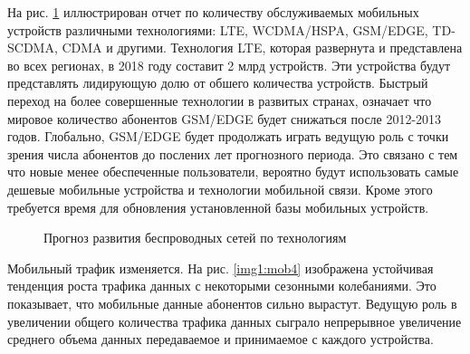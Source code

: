 На рис. \ref{img1:mob3} иллюстрирован отчет по количеству обслуживаемых мобильных устройств различными технологиями: LTE, WCDMA/HSPA, GSM/EDGE, TD-SCDMA, CDMA и другими. Технология LTE, которая развернута и представлена во всех регионах, в 2018 году составит 2 млрд устройств. Эти устройства будут представлять лидирующую долю от обшего количества устройств. Быстрый переход на более совершенные технологии в развитых странах, означает что мировое количество абонентов GSM/EDGE будет снижаться после 2012-2013 годов. Глобально, GSM/EDGE будет продолжать играть ведущую роль с точки зрения числа абонентов до послених лет прогнозного периода. Это связано с тем что новые менее обеспеченные пользователи, вероятно будут использовать самые дешевые мобильные устройства и технологии мобильной связи. Кроме этого требуется время для обновления установленной базы мобильных устройств.


\pgfplotsset{width=15cm, height=10cm, compat=1.3}
\begin{figure} [h]
  \center
{}
\caption{Прогноз развития беспроводных сетей по технологиям \cite{ericsson}}
  \label{img1:mob3}
\end{figure}


Мобильный трафик изменяется. На рис. \ref{img1:mob4} изображена устойчивая тенденция роста трафика данных с некоторыми сезонными колебаниями. Это показывает, что мобильные данные абонентов сильно вырастут. Ведущую роль в увеличении общего количества трафика данных сыграло непрерывное увеличение среднего объема данных передаваемое и принимаемое с каждого устройства.


